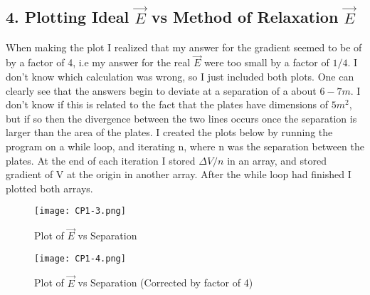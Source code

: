 \documentclass[english]{article}
\begin{document}
\begin{flushleft}
\section*{4. Plotting Ideal $\vec{E}$ vs Method of Relaxation $\vec{E}$}
When making the plot I realized that my answer for the gradient seemed to be of by a factor of 4, i.e my answer for the real $\vec{E}$ were too small by a factor of $1/4$. I don't know which calculation was wrong, so I just included both plots. One can clearly see that the answers begin to deviate at a separation of a about $6-7m$. I don't know if this is related to the fact that the plates have dimensions of $5m^2$, but if so then the divergence between the two lines occurs once the separation is larger than the area of the plates. I created the plots below by running the program on a while loop, and iterating n, where n was the separation between the plates. At the end of each iteration I stored $\Delta V/n$ in an array, and stored gradient of V at the origin in another array. After the while loop had finished I plotted both arrays. 
\begin{figure}[H]
\begin{center}
\texttt{[image: CP1-3.png]}
\caption{Plot of $\vec{E}$ vs Separation}
\end{center}
\end{figure}
\begin{figure}[H]
\begin{center}
\texttt{[image: CP1-4.png]}
\caption{Plot of $\vec{E}$ vs Separation (Corrected by factor of 4)}
\end{center}
\end{figure}
\end{flushleft}
\end{document}
